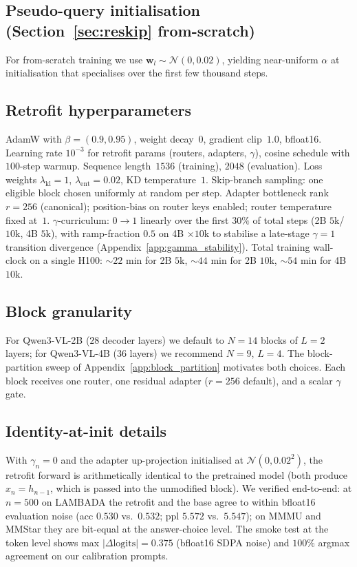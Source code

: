 \documentclass{article}
\begin{document}
\subsection{Pseudo-query initialisation (Section~\ref{sec:reskip} from-scratch)}
For from-scratch training we use $\mathbf{w}_l \sim \mathcal{N}(0, 0.02)$, yielding near-uniform $\alpha$ at initialisation that specialises over the first few thousand steps.

\subsection{Retrofit hyperparameters}
\label{app:retrofit_hparams}
AdamW with $\beta{=}(0.9,0.95)$, weight decay~$0$, gradient clip~$1.0$, bfloat16. Learning rate $10^{-3}$ for retrofit params (routers, adapters, $\gamma$), cosine schedule with $100$-step warmup. Sequence length~$1536$ (training), $2048$ (evaluation). Loss weights $\lambda_{\text{kl}}{=}1$, $\lambda_{\text{ent}}{=}0.02$, KD temperature~$1$. Skip-branch sampling: one eligible block chosen uniformly at random per step. Adapter bottleneck rank $r{=}256$ (canonical); position-bias on router keys enabled; router temperature fixed at~$1$. $\gamma$-curriculum: $0\to 1$ linearly over the first $30\%$ of total steps (2B $5$k/$10$k, 4B $5$k), with ramp-fraction $0.5$ on 4B $\times 10$k to stabilise a late-stage $\gamma{=}1$ transition divergence (Appendix~\ref{app:gamma_stability}). Total training wall-clock on a single H100: $\sim$$22$ min for 2B $5$k, $\sim$$44$ min for 2B $10$k, $\sim$$54$ min for 4B $10$k.

\subsection{Block granularity}
\label{app:block_granularity}
For Qwen3-VL-2B ($28$ decoder layers) we default to $N{=}14$ blocks of $L{=}2$ layers; for Qwen3-VL-4B ($36$ layers) we recommend $N{=}9$, $L{=}4$. The block-partition sweep of Appendix~\ref{app:block_partition} motivates both choices. Each block receives one router, one residual adapter ($r{=}256$ default), and a scalar $\gamma$ gate.

\subsection{Identity-at-init details}
\label{app:identity}
With $\gamma_n{=}0$ and the adapter up-projection initialised at $\mathcal{N}(0, 0.02^2)$, the retrofit forward is arithmetically identical to the pretrained model (both produce $x_n = h_{n-1}$, which is passed into the unmodified block). We verified end-to-end: at $n{=}500$ on LAMBADA the retrofit and the base agree to within bfloat16 evaluation noise (acc $0.530$ vs.\ $0.532$; ppl $5.572$ vs.\ $5.547$); on MMMU and MMStar they are bit-equal at the answer-choice level. The smoke test at the token level shows max $|\Delta\text{logits}| = 0.375$ (bfloat16 SDPA noise) and $100\%$ argmax agreement on our calibration prompts.
\end{document}
